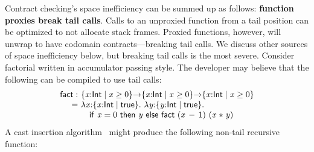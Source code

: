 \documentclass[9pt]{extarticle}
\newcommand{\ottsym}[1]{#1}
\begin{document}
Contract checking's space inefficiency can be summed up as follows:
\textbf{function proxies break tail calls}. Calls to an unproxied
function from a tail position can be optimized to not allocate stack
frames. Proxied functions, however, will unwrap to have codomain
contracts---breaking tail calls.
We discuss other sources of space inefficiency below, but breaking
tail calls is the most severe.
Consider factorial written in accumulator passing style. The developer
may believe that the following can be compiled to use tail calls:
\[ \begin{array}{r@{~}l}
   \mathsf{fact}  : &    \{ \mathit{x} \mathord{:}  \mathsf{Int}  \mathrel{\mid}  \mathit{x}  \mathrel{\ge}  \ottsym{0}  \}  \mathord{ \rightarrow }  \{ \mathit{x} \mathord{:}  \mathsf{Int}  \mathrel{\mid}  \mathit{x}  \mathrel{\ge}  \ottsym{0}  \}   \mathord{ \rightarrow }  \{ \mathit{x} \mathord{:}  \mathsf{Int}  \mathrel{\mid}  \mathit{x}  \mathrel{\ge}  \ottsym{0}  \}   \\
           = &    \lambda \mathit{x} \mathord{:}  \{ \mathit{x} \mathord{:}  \mathsf{Int}  \mathrel{\mid}  \mathsf{true}  \}  .~   \lambda \mathit{y} \mathord{:}  \{ \mathit{y} \mathord{:}  \mathsf{Int}  \mathrel{\mid}  \mathsf{true}  \}  .~  {} \\  &  \quad   \mathsf{if}~  \mathit{x}  \mathrel{=}  \ottsym{0}  ~\mathsf{then}~ \mathit{y} ~\mathsf{else}~  \mathsf{fact}     ~  ( \mathit{x} \,  -  \, \ottsym{1} )   ~  (  \mathit{x}  \mathrel{*}  \mathit{y}  )  
\end{array} \]
A cast insertion algorithm~\cite{Swamy09coercions} might produce the
following non-tail recursive function:
\end{document}

